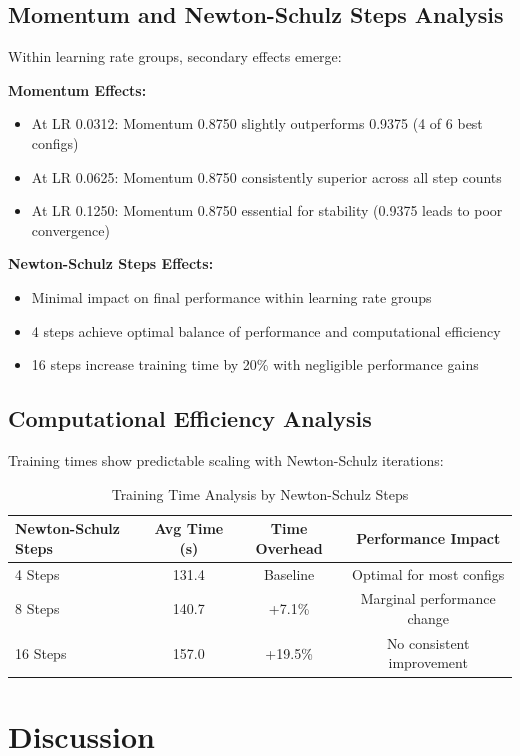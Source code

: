 \documentclass[11pt,a4paper]{article}
\begin{document}
\subsection{Momentum and Newton-Schulz Steps Analysis}
Within learning rate groups, secondary effects emerge:

\textbf{Momentum Effects:}
\begin{itemize}
    \item At LR 0.0312: Momentum 0.8750 slightly outperforms 0.9375 (4 of 6 best configs)
    \item At LR 0.0625: Momentum 0.8750 consistently superior across all step counts
    \item At LR 0.1250: Momentum 0.8750 essential for stability (0.9375 leads to poor convergence)
\end{itemize}

\textbf{Newton-Schulz Steps Effects:}
\begin{itemize}
    \item Minimal impact on final performance within learning rate groups
    \item 4 steps achieve optimal balance of performance and computational efficiency
    \item 16 steps increase training time by 20\% with negligible performance gains
\end{itemize}

\subsection{Computational Efficiency Analysis}
Training times show predictable scaling with Newton-Schulz iterations:

\begin{table}[H]
\centering
\caption{Training Time Analysis by Newton-Schulz Steps}
\label{tab:timing_analysis}
\begin{tabular}{@{}lccc@{}}
\toprule
\textbf{Newton-Schulz Steps} & \textbf{Avg Time (s)} & \textbf{Time Overhead} & \textbf{Performance Impact} \\
\midrule
4 Steps & 131.4 & Baseline & Optimal for most configs \\
8 Steps & 140.7 & +7.1\% & Marginal performance change \\
16 Steps & 157.0 & +19.5\% & No consistent improvement \\
\bottomrule
\end{tabular}
\end{table}

\section{Discussion}
\end{document}
